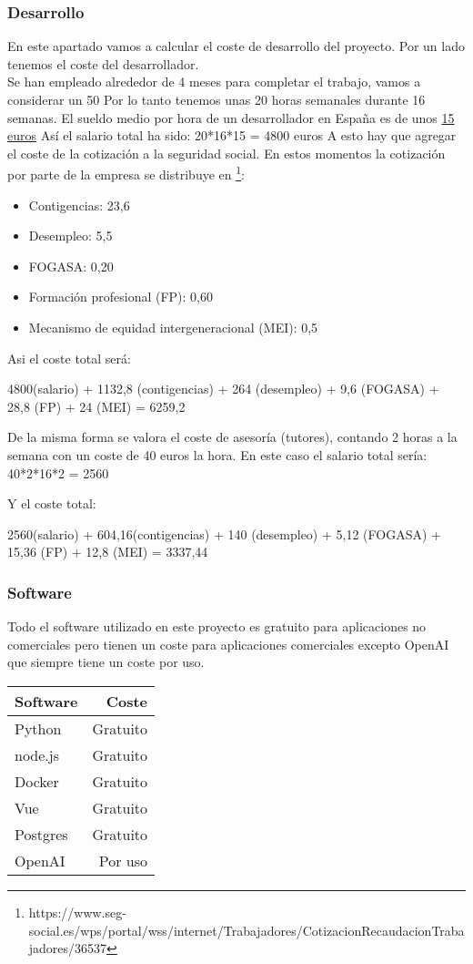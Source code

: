 \subsubsection{Desarrollo}
En este apartado vamos a calcular el coste de desarrollo del proyecto.
Por un lado tenemos el coste del desarrollador.\\
Se han empleado alrededor de 4 meses para completar el trabajo, vamos a considerar 
un 50%
Por lo tanto tenemos unas 20 horas semanales durante 16 semanas.
El sueldo medio por hora de un desarrollador en España es de unos \href{https://es.talent.com}{15 euros} 
Así el salario total ha sido: 20*16*15 = 4800 euros
A esto hay que agregar el coste de la cotización a la seguridad social.
En estos momentos la cotización por parte de la empresa se distribuye en 
\footnote{https://www.seg-social.es/wps/portal/wss/internet/Trabajadores/CotizacionRecaudacionTrabajadores/36537}:
\begin{itemize}
    \item Contigencias: 23,6%
    \item Desempleo: 5,5%
    \item FOGASA: 0,20
    \item Formación profesional (FP): 0,60%
    \item Mecanismo de equidad intergeneracional (MEI): 0,5%
\end{itemize}
Asi el coste total será:

4800(salario) + 1132,8 (contigencias) + 264 (desempleo) + 9,6 (FOGASA) + 28,8 (FP) + 24 (MEI) = 6259,2

De la misma forma se valora el coste de asesoría (tutores), contando 2 horas a la
 semana con un coste de 40 euros la hora. 
En este caso el salario total sería:
40*2*16*2 = 2560

Y el coste total: 

2560(salario) + 604,16(contigencias) +  140 (desempleo) + 5,12 (FOGASA) + 15,36 (FP) + 12,8 (MEI) = 3337,44

\subsubsection{Software}
Todo el software utilizado en este proyecto es gratuito para aplicaciones no comerciales pero tienen un 
coste para aplicaciones comerciales excepto OpenAI que siempre tiene un coste por uso.

\begin{tabular}{l r}
    \hline
    \textbf{Software} & \textbf{Coste}\\ \hline
    Python & Gratuito \\ \hline
    node.js & Gratuito\\ \hline
    Docker & Gratuito\\ \hline
    Vue & Gratuito\\ \hline
    Postgres & Gratuito\\ \hline
    OpenAI & Por uso\\ \hline
\end{tabular}


